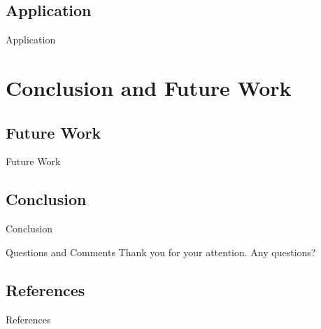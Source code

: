 \documentclass[xcolor={svgnames},compress,aspectratio=169]{beamer}
\begin{document}
\subsection{Application}

\begin{frame}{Application}

\end{frame}

\section{Conclusion and Future Work}

\subsection{Future Work}

\begin{frame}{Future Work}
\end{frame}

\subsection{Conclusion}

\begin{frame}{Conclusion}
\end{frame}

\begin{frame}{Questions and Comments}
    Thank you for your attention. Any questions?
\end{frame}

\subsection{References}

\begin{frame}[allowframebreaks]{References}
    
    
\end{frame}
\end{document}
